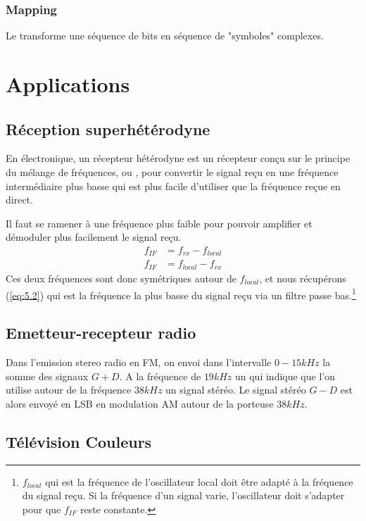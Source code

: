 \subsection{Mapping}

Le  transforme une séquence de bits en séquence de "symboles" complexes.

\chapter{Applications}

\section{Réception superhétérodyne}

En électronique, un récepteur hétérodyne est un récepteur conçu sur le principe du mélange de fréquences, ou , pour convertir le signal reçu en une fréquence intermédiaire plus basse qui est plus facile d'utiliser que la fréquence reçue en direct.

Il faut se ramener à une fréquence plus faible pour pouvoir amplifier et démoduler plus facilement le signal reçu.
\begin{align}
    f_{IF} &= f_{rx} - f_{local}\\
    f_{IF} &= f_{local} - f_{rx}\label{eq:5.2}
\end{align}
Ces deux fréquences sont donc symétriques autour de $f_{local}$, et nous récupérons (\ref{eq:5.2}) qui est la fréquence la plus basse du signal reçu via un filtre passe bas.\footnote{$f_{local}$ qui est la fréquence de l'oscillateur local doit être adapté à la fréquence du signal reçu. Si la fréquence d'un signal varie, l'oscillateur doit s'adapter pour que $f_{IF}$ reste constante.}

\section{Emetteur-recepteur radio}

Dans l'emission stereo radio en FM, on envoi dans l'intervalle $0-15 kHz$ la somme des signaux $G+D$. A la fréquence de $19kHz$ un  qui indique que l'on utilise autour de la fréquence $38 kHz$ un signal stéréo. Le signal stéréo $G-D$ est alors envoyé en LSB en modulation AM autour de la porteuse $38kHz$.

\section{Télévision Couleurs}

